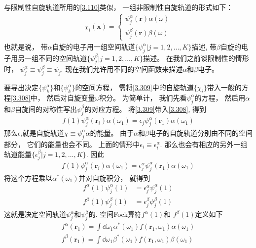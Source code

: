 与限制性自旋轨道所用的\autoref{3.110}类似，
一组非限制性自旋轨道的形式如下：
\begin{align}\label{3.309}
	\chi_i(\mathbf{x}) =
	\begin{cases*}
		\psi_j^\alpha(\mathbf{r})\alpha(\omega)\\
		\psi_j^\beta (\mathbf{r})\beta(\omega)
	\end{cases*}
\end{align}
也就是说，
带$\alpha$自旋的电子用一组空间轨道$\{\psi_j^\alpha |j=1,2,\ldots,K \}$描述, 
带$\beta$自旋的电子用另一组不同的空间轨道$\{\psi_j^\beta |j=1,2,\ldots,K \}$描述。
在我们之前谈限制性的情形时，
$\psi_j^\alpha \equiv \psi_j^\beta \equiv \psi_j$. 
现在我们允许用不同的空间函数来描述$\alpha$和$\beta$电子。


要导出决定$\{\psi_k^\alpha \}$和$\{\psi_k^\alpha \}$的空间方程，
需将\autoref{3.309}中的自旋轨道$\{\chi_i\}$带入一般的\hft 方程\autoref{3.308}中，
然后对自旋变量$\omega$积分。
为简单计，
我们先看$\psi_j^\alpha$的方程，
然后用$\alpha$和$\beta$自旋间的对称性写出$\psi_j^\beta$的对应方程。
将\autoref{3.309}带入\autoref{3.308}, 
得到
\begin{align}\label{3.310}
	f(1)\psi_j^\alpha(\mathbf{r}_i) \alpha(\omega_1) = \epsilon_j \psi_j^\alpha(\mathbf{r}_1) \alpha(\omega_1)
\end{align}
那么$\epsilon_i$就是自旋轨道$\chi\equiv\psi_j^\alpha\alpha$的能量。
由于$\alpha$和$\beta$电子的自旋轨道分别由不同的空间部分，
它们的能量也会不同。
上面的情形中$\epsilon_i\equiv\epsilon^\alpha_i$. 
那么也会有相应的另外一组轨道能量$\{\epsilon_j^\beta | j=1,2,\ldots,K\}$. 
因此
\begin{align}\label{3.311}
	f(1)\psi_j^\alpha(\mathbf{r}_i) \alpha(\omega_1) = \epsilon_j^\alpha \psi_j^\alpha(\mathbf{r}_1) \alpha(\omega_1)
\end{align}
将这个方程乘以$\alpha^*(\omega_1)$并对自旋积分，
就得到
\begin{align}
	f^\alpha(1)\psi_j^\alpha(1) & = \epsilon_j^\alpha \psi_j^\alpha(1) \label{3.312}\\
	f^\beta (1)\psi_j^\beta(1)  & = \epsilon_j^\beta \psi_j^\beta(1)\label{3.313}
\end{align}
这就是决定空间轨道$\psi_j^\alpha$和$\psi_j^\beta$的. 
空间Fock算符$f^\alpha(1)$和 $f^\beta (1)$定义如下
\begin{align}
	f^\alpha(\mathbf{r}_1) = \int\dd\omega_1 \alpha^*(\omega_1) f(\mathbf{r}_1,\omega_1)\alpha(\omega_1) \label{3.314}\\
	f^\beta(\mathbf{r}_1) = \int\dd\omega_1 \beta^*(\omega_1) f(\mathbf{r}_1,\omega_1)\beta(\omega_1) \label{3.315}
\end{align}

